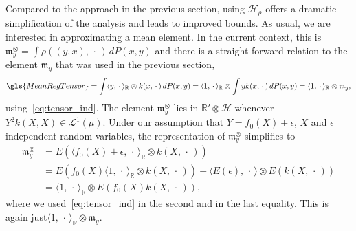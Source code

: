 \documentclass[10pt]{amsart}
\theoremstyle{definition}\newtheorem{defi}[theo]{Definition}\newtheorem{rema}[theo]{Remark}\newtheorem{exam}[theo]{Example}\newtheorem{exem}[theo]{Example}\newtheorem{nota}[theo]{Notation}
\theoremstyle{remark}
\newcommand{\R}{\mathbb{R}}
\newcommand{\dR}{{\R'}}
\newcommand{\cH}{\mathcal{H}}
\newcommand{\clL}{\mathcal{L}}
\newcommand{\mean}{\mathfrak{m}}
\begin{document}
Compared to the approach in the previous section, using $\cH_\rho$ offers a dramatic simplification of the analysis and leads to improved bounds. As usual, we are interested in approximating a mean element. In the current context, this is $\mean^\otimes_y = \int \rho((y,x), \,\cdot\,) \, dP(x,y)$ and there is a straight forward relation to the element $\mean_y$ that was used in the previous section,
\[
\gls{MeanRegTensor}= \int \langle y, \,\cdot\, \rangle_\R \otimes k(x,\,\cdot\,) \, dP(x,y) = \langle 1,\,\cdot\, \rangle_\R \otimes
\int y k(x,\,\cdot\,) \, dP(x,y) = \langle 1,\,\cdot\, \rangle_\R \otimes \mean_y,
\]
using~\eqref{eq:tensor_ind}. The element $\mean^\otimes_y$ lies in $\dR \otimes \cH$ whenever $Y^2 k(X,X) \in \clL^1(\mu)$. Under our assumption that $Y = f_0(X) + \epsilon$, $X$ and $\epsilon$ independent random variables, the representation of $\mean_y^\otimes$ simplifies to
\begin{align*}
\mean_y^\otimes &= E(\langle f_0(X) + \epsilon,\,\cdot\, \rangle_\R \otimes k(X,\,\cdot\,)) \\
&= E(f_0(X) \langle 1, \,\cdot\, \rangle_\R \otimes k(X,\,\cdot\,)) + \langle E(\epsilon), \,\cdot\, \rangle \otimes E(k(X,\,\cdot\,)) \\
&= \langle 1,\,\cdot\, \rangle_\R \otimes E(f_0(X) k(X,\,\cdot\,)),
\end{align*}
where we used~\eqref{eq:tensor_ind} in the second and in the last equality. This is again just\linebreak $\langle 1, \,\cdot\, \rangle_\R \otimes \mean_y$.
\end{document}
